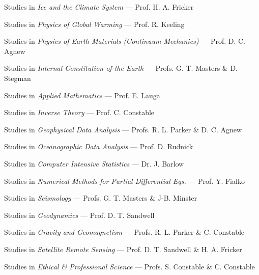 \begin{frontmatter}
\begin{vitapage}
\begin{coursework}
  \item Studies in {\sl Ice and the Climate System} --- Prof. H. A. Fricker
  \item Studies in {\sl Physics of Global Warming} --- Prof. R. Keeling
  \item Studies in {\sl Physics of Earth Materials (Continuum Mechanics)} --- Prof. D. C. Agnew
  \item Studies in {\sl Internal Constitution of the Earth} --- Profs. G. T. Masters \& D. Stegman
  \item Studies in {\sl Applied Mathematics} --- Prof. E. Lauga 
  \item Studies in {\sl Inverse Theory} --- Prof. C. Constable 
  \item Studies in {\sl Geophysical Data Analysis} --- Profs. R. L. Parker \& D. C. Agnew
  \item Studies in {\sl Oceanographic Data Analysis} --- Prof. D. Rudnick 
  \item Studies in {\sl Computer Intensive Statistics} --- Dr. J. Barlow 
  \item Studies in {\sl Numerical Methods for Partial Differential Eqs.} --- Prof. Y. Fialko
  \item Studies in {\sl Seismology} --- Profs. G. T. Masters \& J-B. Minster
  \item Studies in {\sl Geodynamics} --- Prof. D. T. Sandwell
  \item Studies in {\sl Gravity and Geomagnetism} --- Profs. R. L. Parker \& C. Constable
  \item Studies in {\sl Satellite Remote Sensing} --- Prof. D. T. Sandwell \& H. A. Fricker
  \item Studies in {\sl Ethical \& Professional Science} --- Profs. S. Constable \& C. Constable
\end{coursework}

\end{vitapage}



\end{frontmatter}
